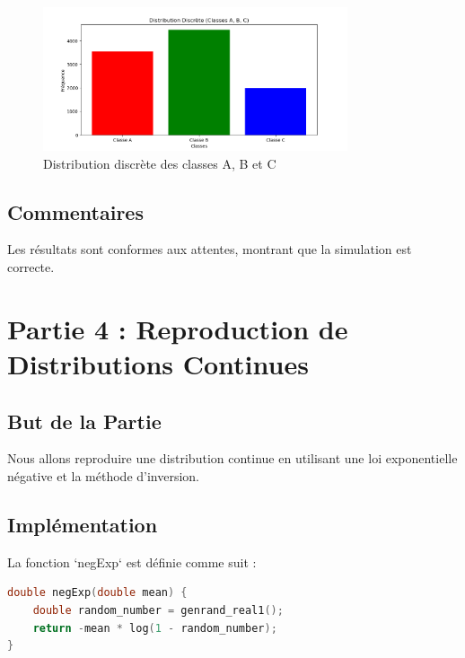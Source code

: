 \documentclass[a4paper,12pt]{report}
\begin{document}
\begin{figure}[h!]
    \centering
    \includegraphics[width=0.8\textwidth]{3.png}
    \caption{Distribution discrète des classes A, B et C}
\end{figure}

\subsection*{Commentaires}
Les résultats sont conformes aux attentes, montrant que la simulation est correcte.

\newpage
\section*{Partie 4 : Reproduction de Distributions Continues}

\subsection*{But de la Partie}
Nous allons reproduire une distribution continue en utilisant une loi exponentielle négative et la méthode d'inversion.

\subsection*{Implémentation}
La fonction `negExp` est définie comme suit :

\begin{lstlisting}[language=C]
double negExp(double mean) {
    double random_number = genrand_real1();
    return -mean * log(1 - random_number);
}
\end{lstlisting}
\end{document}
